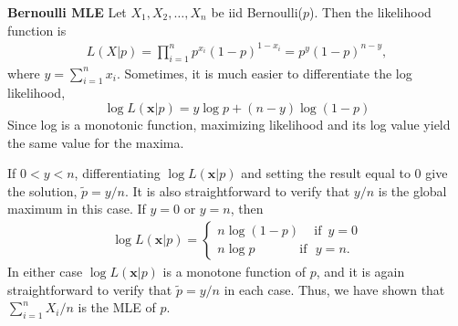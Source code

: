 \documentclass[a4paper,english,12pt]{article}
\begin{document}
\begin{exmp}\textbf{Bernoulli MLE}
Let $X_1,X_2,\dots,X_n$ be iid Bernoulli($p$). Then the likelihood function is
\begin{align}
L(X|p)=\prod\limits_{i=1}^n p^{x_i}(1-p)^{1-x_i}=p^{y}(1-p)^{n-y},
\end{align} 
where ${y}=\sum_{i=1}^n x_i$. Sometimes, it is much easier to differentiate the log likelihood, 
\begin{equation}
\log L(\textbf{x}|p)={y}\log p + (n-{y}	)\log (1-p)
\end{equation}
Since log is a monotonic function, maximizing likelihood and its log value yield the same value for the maxima.
\par If $0<y<n$, differentiating $\log L(\textbf{x}|p)$ and setting the result equal to $0$ give the solution, $\tilde{p}=y/n$. It is also straightforward to verify that $y/n$ is the global maximum in this case. If $y=0$ or $y=n$, then
\begin{align}
\log L(\textbf{x}|p) = 
\begin{cases}
n\log(1-p)\,\,\,\,\,\,\,\mbox{if}\,\,\, y=0\\
n\log p\,\,\,\,\,\,\,\,\,\,\,\,\,\,\,\,\,\,\,\,\,\mbox{if}\,\,\,\, y=n.
\end{cases}
\end{align}
In either case $\log L(\textbf{x}|p)$ is a monotone function of $p$, and it is again straightforward to verify that $\tilde{p}=y/n$  in each case. Thus, we have shown that $\sum_{i=1}^n {X_i}/n$  is the MLE of $p$.
\end{exmp}
\end{document}
